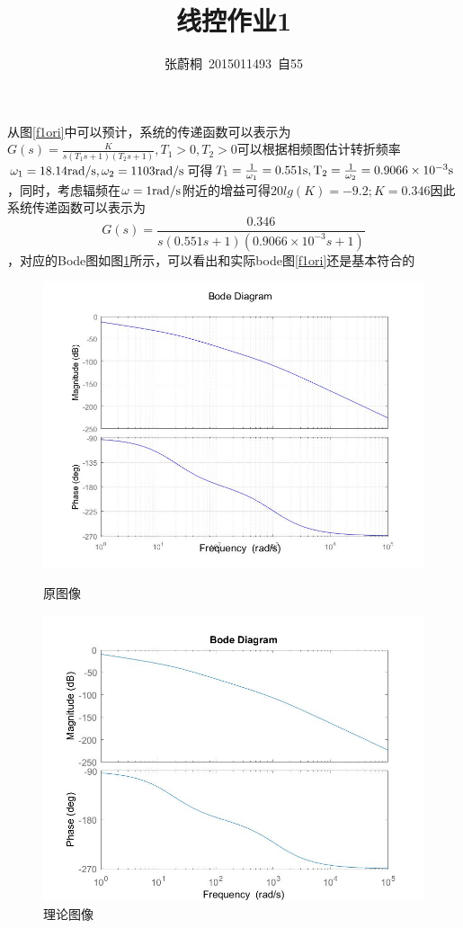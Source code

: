\documentclass[UTF8,a4paper]{ctexart}
\title{线控作业1}
\author{张蔚桐\ 2015011493\ 自55}
\begin{document}
\maketitle
\section{}
\section{}
从图\ref{f1ori}中可以预计，系统的传递函数可以表示为$G(s)=\frac{K}{s(T_1s+1)(T_2s+1)},T_1>0,T_2>0$可以根据相频图估计转折频率$\omega_1=18.14\rm{rad/s},\omega_2=1103\rm{rad/s}$可得$T_1=\frac{1}{\omega_1}=0.551\rm{s},T_2=\frac{1}{\omega_2}=0.9066\times 10^{-3}\rm{s}$，同时，考虑辐频在$\omega=1\rm{rad/s}$附近的增益可得$20lg(K)=-9.2;K=0.346$因此系统传递函数可以表示为$$G(s)=\frac{0.346}{s(0.551s+1)(0.9066\times 10^{-3}s+1)}$$，对应的Bode图如图\ref{f1the}所示，可以看出和实际bode图\ref{f1ori}还是基本符合的
\begin{figure}
\centering
\includegraphics[width=\textwidth]{motorG.jpg}
\caption{原图像}
\label{f1ori}
\includegraphics[width=\textwidth]{RmotorG.jpg}
\caption{理论图像}
\label{f1the}
\end{figure}
\end{document}
